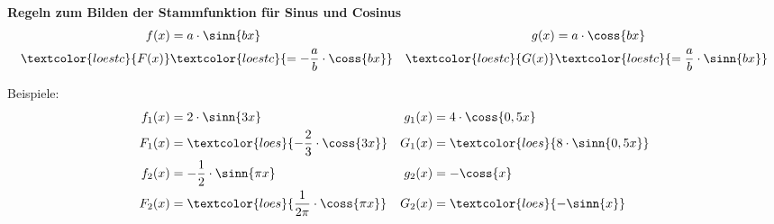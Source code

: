\begin{tcolorbox}
	\textbf{Regeln zum Bilden der Stammfunktion für Sinus und Cosinus
		\begin{align*}
			f(x)&=a\cdot\sinn{bx}&g(x)&=a\cdot\coss{bx}\\
			\textcolor{loestc}{F(x)}&\textcolor{loestc}{=-\frac{a}{b}\cdot\coss{bx}}&\textcolor{loestc}{G(x)}&\textcolor{loestc}{=\frac{a}{b}\cdot\sinn{bx}}\\
		\end{align*}
	}
\end{tcolorbox}
Beispiele:
\begin{align*}
	f_1(x)&=2\cdot\sinn{3x}&g_1(x)&=4\cdot\coss{0,5x}\\
	F_1(x)&=\textcolor{loes}{-\frac{2}{3}\cdot\coss{3x}}&G_1(x)&=\textcolor{loes}{8\cdot\sinn{0,5x}}\\
	f_2(x)&=-\frac{1}{2}\cdot\sinn{\pi x}&g_2(x)&=-\coss{x}\\
	F_2(x)&=\textcolor{loes}{\frac{1}{2\pi}\cdot\coss{\pi x}}&G_2(x)&=\textcolor{loes}{-\sinn{x}}\\
\end{align*}


